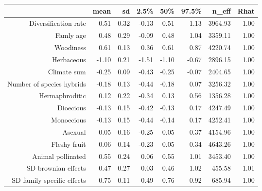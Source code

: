 \begin{table}[ht]
\centering
\begin{tabular}{rrrrrrrr}
  \hline
 & mean & sd & 2.5\% & 50\% & 97.5\% & n\_eff & Rhat \\ 
  \hline
Diversification rate & 0.51 & 0.32 & -0.13 & 0.51 & 1.13 & 3964.93 & 1.00 \\ 
  Famly age & 0.48 & 0.29 & -0.09 & 0.48 & 1.04 & 3359.11 & 1.00 \\ 
  Woodiness & 0.61 & 0.13 & 0.36 & 0.61 & 0.87 & 4220.74 & 1.00 \\ 
  Herbaceous & -1.10 & 0.21 & -1.51 & -1.10 & -0.67 & 2896.15 & 1.00 \\ 
  Climate sum & -0.25 & 0.09 & -0.43 & -0.25 & -0.07 & 2404.65 & 1.00 \\ 
  Number of species hybrids & -0.18 & 0.13 & -0.44 & -0.18 & 0.07 & 3256.32 & 1.00 \\ 
  Hermaphroditic & 0.12 & 0.22 & -0.34 & 0.13 & 0.56 & 1356.28 & 1.00 \\ 
  Dioecious & -0.13 & 0.15 & -0.42 & -0.13 & 0.17 & 4247.49 & 1.00 \\ 
  Monoecious & -0.13 & 0.15 & -0.44 & -0.14 & 0.17 & 4252.41 & 1.00 \\ 
  Asexual & 0.05 & 0.16 & -0.25 & 0.05 & 0.37 & 4154.96 & 1.00 \\ 
  Fleshy fruit & 0.06 & 0.14 & -0.23 & 0.05 & 0.34 & 4643.26 & 1.00 \\ 
  Animal pollinated & 0.55 & 0.24 & 0.06 & 0.55 & 1.01 & 3453.40 & 1.00 \\ 
  SD brownian effects & 0.47 & 0.27 & 0.03 & 0.46 & 1.02 & 455.58 & 1.01 \\ 
  SD family specific effects & 0.75 & 0.11 & 0.49 & 0.76 & 0.92 & 685.94 & 1.00 \\ 
   \hline
\end{tabular}
\end{table}
